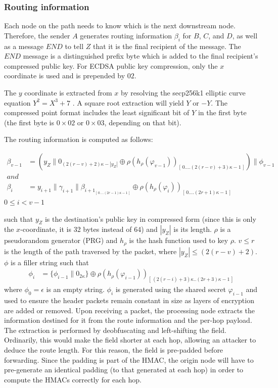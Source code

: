 \subsubsection{Routing information}
Each node on the path needs to know which is the next downstream node. Therefore, the sender $A$ generates routing information $\beta_i$ for $B$, $C$, and $D$, as well as a message $END$ to tell $Z$ that it is the final recipient of the message.  The $END$ message is a distinguished prefix byte which is added to the final recipient's compressed public key. For ECDSA public key compression, only the $x$ coordinate is used and is prepended by $02$.

The $y$ coordinate is extracted from $x$ by resolving the secp256k1 elliptic curve equation $Y^2=X^3+7$ \cite{secp}. A square root extraction will yield $Y$ or $-Y$. The compressed point format includes the least significant bit of $Y$ in the first byte (the first byte is $0\times02$ or $0\times03$, depending on that bit).

The routing information is computed as follows:

\begin{align}
    \beta_{v-1} & =(y_Z\|0_{(2(r-v)+2)\kappa-|y_Z|}\oplus \rho(h_{\rho}(\varphi_{v-1}))_{[ \,0....(2(r-v)+3)\kappa-1\,]})\|\phi_{v-1}                \\
    and         & \nonumber                                                                                                                          \\
    \beta_i     & =y_{i+1}\|\gamma_{i+1}\|\beta_{{i+1}_{[ \,0....(2r-1)\kappa-1\,] }}\oplus \rho(h_{\rho}(\varphi_{i}))_{[ \,0....(2r+1)\kappa-1\,]}
    \label{eq:2}
\end{align}
$0\le i < v-1$

such that $y_Z$ is the destination's public key in compressed form (since this is only the $x$-coordinate, it is 32 bytes instead of 64) and $|y_Z|$ is its length. $\rho$ is a pseudorandom generator (PRG) and $h_{\rho}$ is the hash function used to key $\rho$.
$v\leq r$ is the length of the path traversed by the packet, where $|y_Z| \leq (2(r - v) + 2)$. $\phi$ is a filler string such that
\begin{align}
    \phi_i & =\{ \phi_{i-1}\|0_{2\kappa}\}\oplus \rho(h_{\rho}(\varphi_{i-1}))_{[ \,(2(r-i)+3)\kappa..(2r+3)\kappa-1\,]}
\end{align}
where $\phi_0=\epsilon$ is an empty string. $\phi_i$ is generated using the shared secret $\varphi_{i-1}$ and used to ensure the header packets remain constant in size as layers of encryption are added or removed. Upon receiving a packet, the processing node extracts the information destined for it from the route information and the per-hop payload. The extraction is performed by deobfuscating and left-shifting the field. Ordinarily, this would make the field shorter at each hop, allowing an attacker to deduce the route length. For this reason, the field is pre-padded before forwarding. Since the padding is part of the HMAC, the origin node will have to pre-generate an identical padding (to that generated at each hop) in order to compute the HMACs correctly for each hop.

